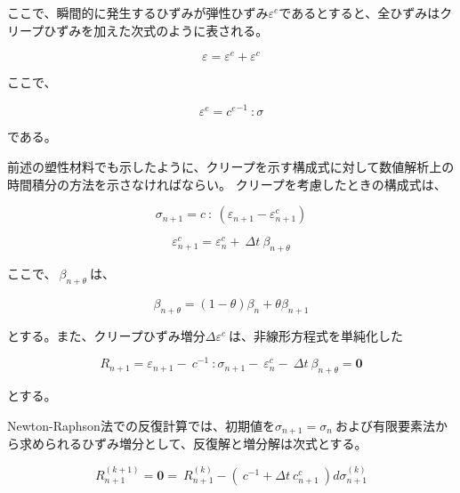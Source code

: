 \documentclass[a4paper,pandoc,ja=standard]{bxjsarticle}
\begin{document}
ここで、瞬間的に発生するひずみが弾性ひずみ\(\varepsilon^e\)であるとすると、全ひずみはクリープひずみを加えた次式のように表される。

\begin{equation}
\varepsilon = \varepsilon^e + \varepsilon^c
\label{eq:2.2.60}
\end{equation}

ここで、

\begin{equation}
\varepsilon^e = {c^e}^{-1}\ : \sigma
\label{eq:2.2.61}
\end{equation}

である。

前述の塑性材料でも示したように、クリープを示す構成式に対して数値解析上の時間積分の方法を示さなければならい。
クリープを考慮したときの構成式は、

\begin{equation}
\sigma_{n + 1} = c\ :\ ( \varepsilon_{n + 1} - \varepsilon_{n + 1}^c )
\label{eq:2.2.62}
\end{equation}

\begin{equation}
\varepsilon_{n + 1}^c = \varepsilon_n^c + \ \Delta t\ \beta_{n + \theta}
\label{eq:2.2.63}
\end{equation}

ここで、\(\ \beta_{n + \theta}\ \)は、

\begin{equation}
\beta_{n + \theta} = ( 1 - \theta  ) \beta_n + \theta \beta_{n + 1}
\label{eq:2.2.64}
\end{equation}

とする。また、クリープひずみ増分\(\Delta \varepsilon^c\ \)は、非線形方程式を単純化した

\begin{equation}
R_{n + 1} = \varepsilon_{n + 1} - \ c^{- 1}\ : \sigma_{n + 1} - \ \varepsilon_n^c - \ \Delta t\ \beta_{n + \theta} = \mathbf{0}
\label{eq:2.2.65}
\end{equation}

とする。

Newton-Raphson法での反復計算では、初期値を\(\sigma_{n + 1} = \sigma_n\ \)および有限要素法から求められるひずみ増分として、反復解と増分解は次式とする。

\begin{equation}
R_{n + 1}^{(k + 1)} = \mathbf{0} = \ R_{n + 1}^{(k)} - ( \ c^{- 1} + \Delta t\ c_{n + 1}^c\  ) d \sigma_{n + 1}^{(k)}
\label{eq:2.2.66}
\end{equation}
\end{document}
